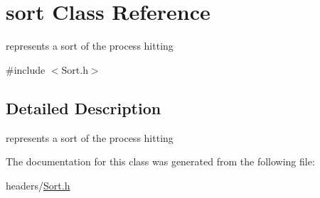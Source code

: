 \hypertarget{classsort}{\section{sort \-Class \-Reference}
\label{classsort}
}


represents a sort of the process hitting  




{\ttfamily \#include $<$\-Sort.\-h$>$}



\subsection{\-Detailed \-Description}
represents a sort of the process hitting 

\-The documentation for this class was generated from the following file\-:\begin{DoxyCompactItemize}
\item 
headers/\hyperlink{_sort_8h}{\-Sort.\-h}\end{DoxyCompactItemize}
